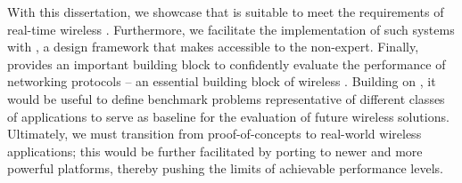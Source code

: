 \startsquarepar
With this dissertation, we showcase that \ST is suitable to meet the requirements of real-time wireless \CPS. Furthermore, we facilitate the implementation of such systems with \baloo, a design framework that makes \ST accessible to the non-expert. Finally, \triscale provides an important building block to confidently evaluate the performance of networking protocols -- an essential building block of wireless \CPS.
Building on \triscale, it would be useful to define benchmark problems representative of different classes of applications to serve as baseline for the evaluation of future wireless \CPS solutions. Ultimately, we must transition from proof-of-concepts to real-world wireless \CPS applications; this would be further facilitated by porting \baloo to newer and more powerful platforms, thereby pushing the limits of achievable performance levels.
\stopsquarepar
